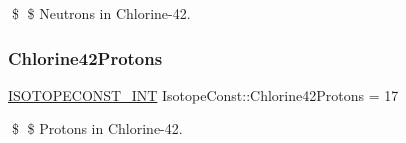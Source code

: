 \$ \$ Neutrons in Chlorine-\/42. \mbox{\label{group___isotope_const-_chlorine-_cl42_ga6aad36ab41d78d52134095dbb4ae5557}} 
\subsubsection{\texorpdfstring{Chlorine42\+Protons}{Chlorine42Protons}}
{\footnotesize\ttfamily \mbox{\hyperlink{group___isotope_const-_macros_ga5f18360b3e99483a35c32d789e62621c}{I\+S\+O\+T\+O\+P\+E\+C\+O\+N\+S\+T\+\_\+\+I\+NT}} Isotope\+Const\+::\+Chlorine42\+Protons = 17}

\$ \$ Protons in Chlorine-\/42. 